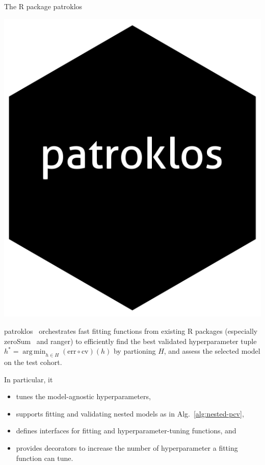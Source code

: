 \documentclass[10pt, aspectratio=169]{beamer}
\DeclareMathOperator*{\argmin}{arg\,min}
\begin{document}
\begin{frame}{The R package patroklos}
  \begin{minipage}{0.15\textwidth}
    \centering
    \includegraphics[width=\textwidth]{figs/logo.png}
  \end{minipage}
  \hfill
  \begin{minipage}{0.8\textwidth}
    \raggedright
    patroklos~\cite{patroklos} orchestrates fast fitting functions from existing 
    R packages (especially zeroSum~\cite{zerosumR} and ranger) to efficiently 
    find the best validated hyperparameter tuple
    $h^* = \argmin_{h \in H} (\text{err} \circ \text{cv})(h)$ by partioning 
    $H$, and assess the selected model on the test cohort.
  \end{minipage}

  \pause
  In particular, it 
  \begin{itemize}
    \item tunes the model-agnostic hyperparameters,
    \item supports fitting and validating nested models as in Alg.~\ref{alg:nested-pcv},
    \item defines interfaces for fitting and hyperparameter-tuning functions, and 
    \item provides decorators to increase the number of hyperparameter  
      a fitting function can tune.
  \end{itemize}
\end{frame}
\end{document}
